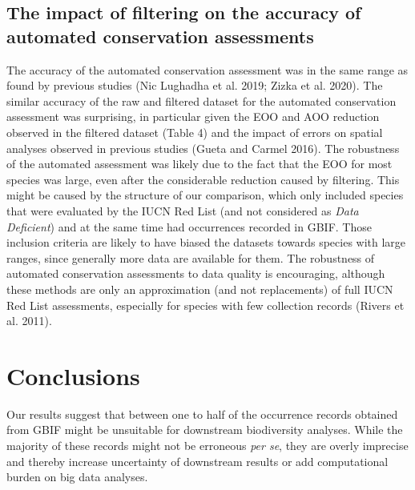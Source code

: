 \documentclass[fleqn,10pt,lineno]{wlpeerj} %
\begin{document}
\hypertarget{the-impact-of-filtering-on-the-accuracy-of-automated-conservation-assessments}{%
\subsection*{The impact of filtering on the accuracy of automated conservation assessments}\label{the-impact-of-filtering-on-the-accuracy-of-automated-conservation-assessments}}

The accuracy of the automated conservation assessment was in the same range as found by previous studies (Nic Lughadha et al. 2019; Zizka et al. 2020). The similar accuracy of the raw and filtered dataset for the automated conservation assessment was surprising, in particular given the EOO and AOO reduction observed in the filtered dataset (Table 4) and the impact of errors on spatial analyses observed in previous studies (Gueta and Carmel 2016). The robustness of the automated assessment was likely due to the fact that the EOO for most species was large, even after the considerable reduction caused by filtering. This might be caused by the structure of our comparison, which only included species that were evaluated by the IUCN Red List (and not considered as \emph{Data Deficient}) and at the same time had occurrences recorded in GBIF. Those inclusion criteria are likely to have biased the datasets towards species with large ranges, since generally more data are available for them. The robustness of automated conservation assessments to data quality is encouraging, although these methods are only an approximation (and not replacements) of full IUCN Red List assessments, especially for species with few collection records (Rivers et al. 2011).

\hypertarget{conclusions}{%
\section*{Conclusions}\label{conclusions}}

Our results suggest that between one to half of the occurrence records obtained from GBIF might be unsuitable for downstream biodiversity analyses. While the majority of these records might not be erroneous \emph{per se}, they are overly imprecise and thereby increase uncertainty of downstream results or add computational burden on big data analyses.
\end{document}
